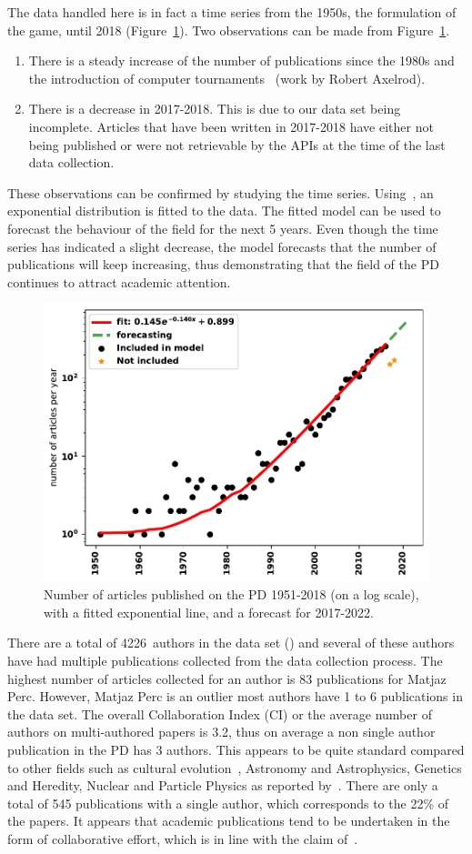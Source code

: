 \documentclass{article}
\theoremstyle{definition}
\newcommand{\authors}{4226}
\begin{document}
The data handled here is in fact a time series from the 1950s, the formulation
of the game, until 2018 (Figure~\ref{fig:timeseries}). Two observations can be
made from Figure~\ref{fig:timeseries}.

\begin{enumerate}
    \item There is a steady increase of the number of publications since the
    1980s and the introduction of computer tournaments~\citep{Axelrod1981}
    (work by Robert Axelrod).
    \item There is a decrease in 2017-2018. This is due to our data set being
    incomplete. Articles that have been written in 2017-2018 have either not
    being published or were not retrievable by the APIs at the time of the last
    data collection.
\end{enumerate}

These observations can be confirmed by studying the time series.
Using~\citep{scipy}, an exponential distribution is fitted to the data.
The fitted model can be used to forecast the
behaviour of the field for the next 5 years. Even
though the time series has indicated a slight decrease, the model forecasts that
the number of publications will keep increasing, thus demonstrating that the
field of the PD continues to attract academic attention.

\begin{figure}[!hbtp]
    \centering
    \includegraphics[width=.50\textwidth]{forecasting.pdf}
    \caption{Number of articles published on the PD 1951-2018 (on a log scale),
    with a fitted exponential line, and a forecast for 2017-2022.}\label{fig:timeseries}
\end{figure}

There are a total of \authors~authors in the data set (\citep{pd_data_2018}) and several of these
authors have had multiple publications collected from the data collection process.
The highest number of articles collected for an
author is 83 publications for Matjaz Perc. However, Matjaz Perc is an outlier
most authors have 1 to 6 publications in the data set.
The overall Collaboration Index (CI) or the average number of authors on
multi-authored papers is 3.2, thus on average a non single author publication in
the PD has 3 authors. This appears to be quite standard compared to other fields
such as cultural evolution~\citep{youngblood2018}, Astronomy and Astrophysics,
Genetics and Heredity, Nuclear and Particle Physics as reported
by~\citep{nature_author_blog}.
There are only a total of 545 publications with a single author, which
corresponds to the 22\% of the papers. It appears that academic publications
tend to be undertaken in the form of collaborative effort, which is in line
with the claim of~\citep{Kyvik2017}.
\end{document}
